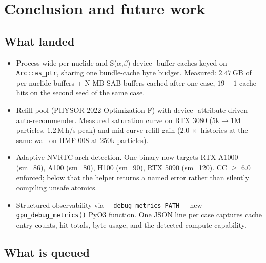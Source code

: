 \section{Conclusion and future work}
\label{sec:conclusion}

\subsection{What landed}

\begin{itemize}
    \item Process-wide per-nuclide and S($\alpha$,$\beta$) device-
        buffer caches keyed on \texttt{Arc::as\_ptr}, sharing one
        bundle-cache byte budget. Measured: $2.47\,$GB of
        per-nuclide buffers + N-MB SAB buffers cached after one
        case, $19+1$ cache hits on the second seed of the same
        case.
    \item Refill pool (PHYSOR 2022 Optimization F) with device-
        attribute-driven auto-recommender. Measured saturation
        curve on RTX 3080 (5k$\to$1M particles, $1.2\,$M\,h/s
        peak) and mid-curve refill gain ($2.0\,\times$ histories
        at the same wall on HMF-008 at 250k particles).
    \item Adaptive NVRTC arch detection. One binary now targets
        RTX A1000 (sm\_86), A100 (sm\_80), H100 (sm\_90), RTX
        5090 (sm\_120). CC $\geq$ 6.0 enforced; below that the
        helper returns a named error rather than silently
        compiling unsafe atomics.
    \item Structured observability via \texttt{-{}-debug-metrics
        PATH} + new \texttt{gpu\_debug\_metrics()} PyO3 function.
        One JSON line per case captures cache entry counts, hit
        totals, byte usage, and the detected compute capability.
\end{itemize}

\subsection{What is queued}

